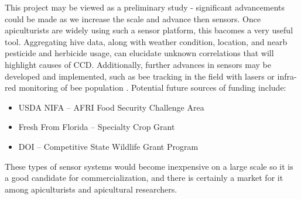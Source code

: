 
This project may be viewed as a preliminary study - significant advancements could be made as we increase the scale and advance then sensors. Once apiculturists are widely using such a sensor platform, this bacomes a very useful tool. Aggregating hive data, along with weather condition, location, and nearb pesticide and herbicide usage, can elucidate unknown correlations that will highlight causes of CCD. Additionally, further advances in sensors may be developed and implemented, such as bee tracking in the field with lasers \cite{carlsten2011field} or infra-red monitoring of bee population \cite{shaw2011long}. Potential future sources of funding include:

\begin{itemize}
\item USDA NIFA -- AFRI Food Security Challenge Area
\item Fresh From Florida -- Specialty Crop Grant
\item DOI -- Competitive State Wildlife Grant Program
\end{itemize}

These types of sensor systems would become inexpensive on a large scale so it is a good candidate for commercialization, and there is certainly a market for it among apiculturists and apicultural researchers.
